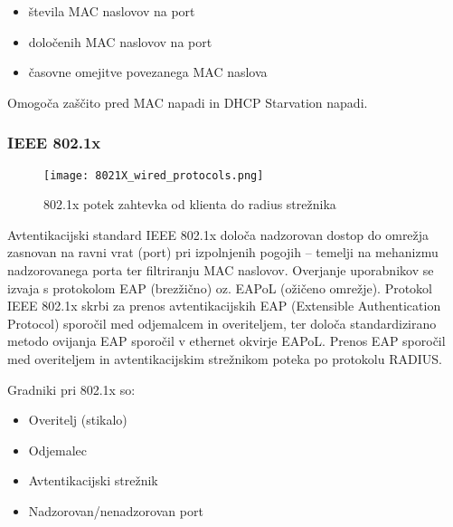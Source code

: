 \documentclass[12pt]{article}
\begin{document}
\begin{itemize}
    \item števila MAC naslovov na port
    \item določenih MAC naslovov na port
    \item časovne omejitve povezanega MAC naslova 
\end{itemize}

Omogoča zaščito pred MAC napadi in DHCP Starvation napadi.


\subsubsection{IEEE 802.1x}
 
\begin{figure}[htb]
\begin{center}
\texttt{[image: 8021X\_wired\_protocols.png]}
\end{center}
\caption{802.1x potek zahtevka od klienta do radius strežnika}
\label{802.1x}
\end{figure}

Avtentikacijski standard IEEE 802.1x določa nadzorovan dostop do omrežja zasnovan na ravni vrat (port) pri izpolnjenih pogojih – temelji na mehanizmu nadzorovanega porta ter filtriranju MAC naslovov.
Overjanje uporabnikov se izvaja s protokolom EAP (brezžično) oz. EAPoL (ožičeno omrežje). Protokol IEEE 802.1x skrbi za prenos avtentikacijskih EAP (Extensible Authentication Protocol) sporočil med odjemalcem in overiteljem, ter določa standardizirano metodo ovijanja EAP sporočil v ethernet okvirje EAPoL. Prenos EAP sporočil  med overiteljem in avtentikacijskim strežnikom poteka po protokolu RADIUS.

Gradniki pri 802.1x so:

\begin{itemize}
    \item Overitelj (stikalo)
    \item Odjemalec
    \item Avtentikacijski strežnik  
    \item Nadzorovan/nenadzorovan port
\end{itemize}
 
\end{document}
